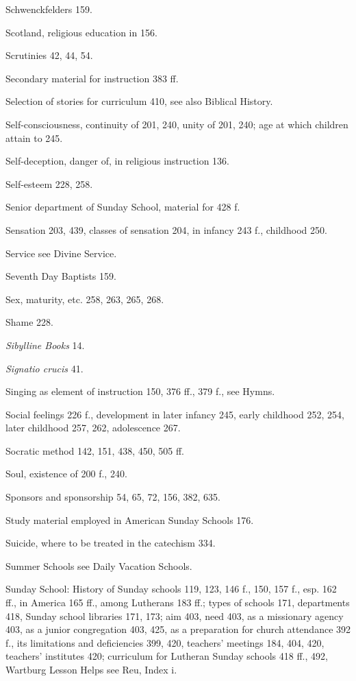 Schwenckfelders 159.

Scotland, religious education in 156.

Scrutinies 42, 44, 54.

Secondary material for instruction 383 ff.

Selection of stories for curriculum 410, see also Biblical History.

Self-consciousness, continuity of 201, 240, unity of 201, 240; age at which children attain to 245.

Self-deception, danger of, in religious instruction 136.

Self-esteem 228, 258.

Senior department of Sunday School, material for 428 f.

Sensation 203, 439, classes of sensation 204, in infancy 243 f., childhood 250.

Service see Divine Service.

Seventh Day Baptists 159.

Sex, maturity, etc. 258, 263, 265, 268.

Shame 228.

\emph{Sibylline Books} 14.

\emph{Signatio crucis} 41.

Singing as element of instruction 150, 376 ff., 379 f., see Hymns.

Social feelings 226 f., development in later infancy 245, early childhood 252, 254, later childhood 257, 262, adolescence 267.

Socratic method 142, 151, 438, 450, 505 ff.

Soul, existence of 200 f., 240.

Sponsors and sponsorship 54, 65, 72, 156, 382, 635.

Study material employed in American Sunday Schools 176.

Suicide, where to be treated in the catechism 334.

Summer Schools see Daily Vacation Schools.

Sunday School: History of Sunday schools 119, 123, 146 f., 150, 157 f., esp. 162 ff., in America 165 ff., among Lutherans 183 ff.; types of schools 171, departments 418, Sunday school libraries 171, 173; aim 403, need 403, as a missionary agency 403, as a junior congregation 403, 425, as a preparation for church attendance 392 f., its limitations and deficiencies 399, 420, teachers’ meetings 184, 404, 420, teachers’ institutes 420; curriculum for Lutheran Sunday schools 418 ff., 492, Wartburg Lesson Helps see Reu, Index i.

